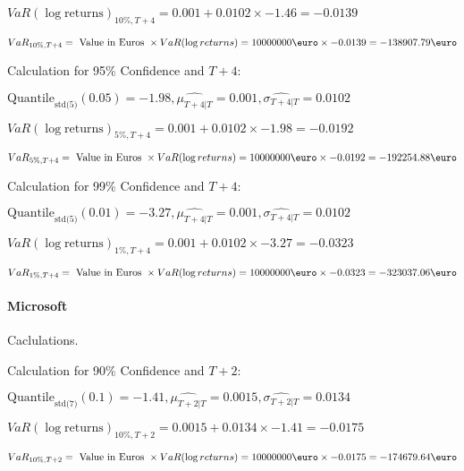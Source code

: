 \indent\indent $VaR(\log \text{returns})_{10\%, T + 4} = 0.001 + 0.0102\times-1.46 = -0.0139$

\indent\indent $VaR_{10\%, T + 4} = \text{ Value in Euros } \times VaR(\log returns) = 10 000 000 \text{\euro} \times-0.0139 = -138907.79 \text{\euro}$\newline




Calculation for 95\% Confidence and $T+4$:

\indent\indent $\text{Quantile}_\text{std(5)}(0.05) = -1.98,\hat{\mu_{T+4|T}} = 0.001, \hat{\sigma_{T+4|T}} = 0.0102$

\indent\indent $VaR(\log \text{returns})_{5\%, T + 4} = 0.001 + 0.0102\times-1.98 = -0.0192$

\indent\indent $VaR_{5\%, T + 4} = \text{ Value in Euros } \times VaR(\log returns) = 10 000 000 \text{\euro} \times-0.0192 = -192254.88 \text{\euro}$\newline




Calculation for 99\% Confidence and $T+4$:

\indent\indent $\text{Quantile}_\text{std(5)}(0.01) = -3.27,\hat{\mu_{T+4|T}} = 0.001, \hat{\sigma_{T+4|T}} = 0.0102$

\indent\indent $VaR(\log \text{returns})_{1\%, T + 4} = 0.001 + 0.0102\times-3.27 = -0.0323$

\indent\indent $VaR_{1\%, T + 4} = \text{ Value in Euros } \times VaR(\log returns) = 10 000 000 \text{\euro} \times-0.0323 = -323037.06 \text{\euro}$\newline
\paragraph{Microsoft} Caclulations.\newline \indent 





Calculation for 90\% Confidence and $T+2$:

\indent\indent $\text{Quantile}_\text{std(7)}(0.1) = -1.41,\hat{\mu_{T+2|T}} = 0.0015, \hat{\sigma_{T+2|T}} = 0.0134$

\indent\indent $VaR(\log \text{returns})_{10\%, T + 2} = 0.0015 + 0.0134\times-1.41 = -0.0175$

\indent\indent $VaR_{10\%, T + 2} = \text{ Value in Euros } \times VaR(\log returns) = 10 000 000 \text{\euro} \times-0.0175 = -174679.64 \text{\euro}$\newline





